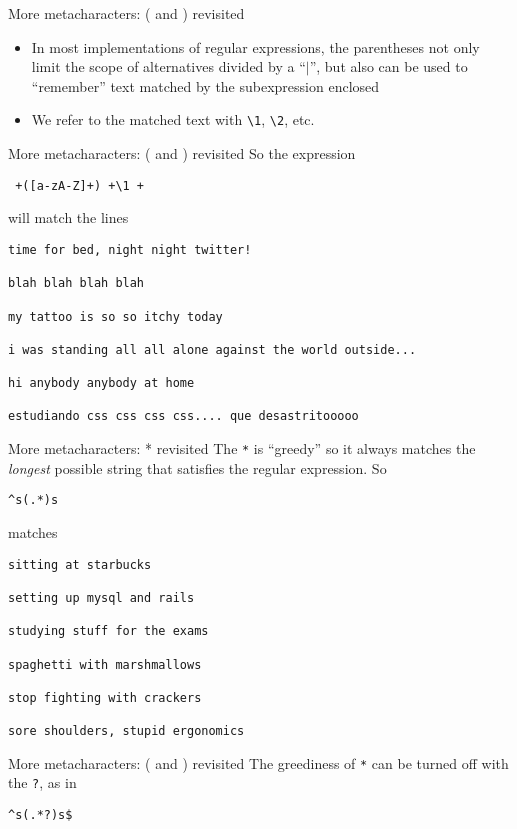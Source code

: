 \documentclass[aspectratio=169]{beamer}
\begin{document}
\begin{frame}[fragile]{More metacharacters: ( and ) revisited}
\begin{itemize}
\item
In most implementations of regular expressions, the parentheses not
only limit the scope of alternatives divided by a ``$|$'', but also
can be used to ``remember'' text matched by the subexpression enclosed
\item
We refer to the matched text with \verb+\1+, \verb+\2+, etc.
\end{itemize}
\end{frame}

\begin{frame}[fragile]{More metacharacters: ( and ) revisited}
So the expression 
\begin{verbatim}
 +([a-zA-Z]+) +\1 +
\end{verbatim}
will match the lines 
\begin{verbatim}
time for bed, night night twitter!

blah blah blah blah 

my tattoo is so so itchy today

i was standing all all alone against the world outside...

hi anybody anybody at home

estudiando css css css css.... que desastritooooo
\end{verbatim}
\end{frame}

\begin{frame}[fragile]{More metacharacters: * revisited}
The \verb+*+ is ``greedy'' so it always matches the \textit{longest}
possible string that satisfies the regular expression. So
\begin{verbatim}
^s(.*)s
\end{verbatim}
matches
\begin{verbatim}
sitting at starbucks

setting up mysql and rails

studying stuff for the exams

spaghetti with marshmallows

stop fighting with crackers

sore shoulders, stupid ergonomics
\end{verbatim}
\end{frame}

\begin{frame}[fragile]{More metacharacters: ( and ) revisited}
The greediness of \verb+*+ can be turned off with the \verb+?+, as in
\begin{verbatim}
^s(.*?)s$
\end{verbatim}
\end{frame}
\end{document}
